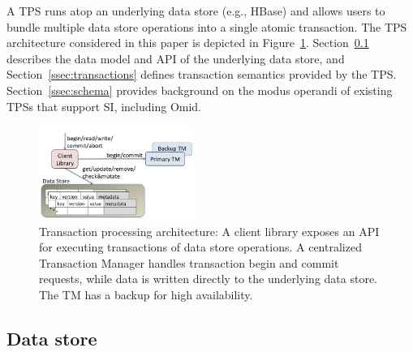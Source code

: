 


A TPS runs atop an underlying data store 
(e.g., HBase) and 
allows users to bundle multiple data store operations into a single atomic transaction. 
The TPS architecture considered in this paper is depicted in Figure~\ref{fig:components}.
Section~\ref{ssec:data-model} describes the data model and API of the underlying data store, and  Section~\ref{ssec:transactions} defines transaction semantics provided by the TPS. 
Section~\ref{ssec:schema} provides  background on the modus operandi of existing TPSs that support SI, including Omid. 


\begin{figure}
\centerline{
\includegraphics[width=0.45\textwidth]{FragolaComponents.jpg}
}
\caption{Transaction processing architecture: A client library exposes an  API for  executing transactions of data store operations. 
A centralized Transaction Manager handles transaction begin and commit requests, while data is written directly to the underlying data store.
The TM has a backup for high availability.}
\label{fig:components}
\end{figure}

\subsection{Data store}
\label{ssec:data-model}

